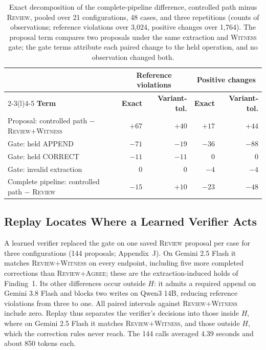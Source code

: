 \documentclass[acmsmall,review,anonymous]{acmart}
\newcommand{\agree}{\textsc{Agree}}
\newcommand{\witness}{\textsc{Witness}}
\newcommand{\review}{\textsc{Review}}
\begin{document}
\begin{table}[tbp]
\centering
\caption{Exact decomposition of the complete-pipeline difference, controlled path minus \review{}, pooled over 21 configurations, 48 cases, and three repetitions (counts of observations; reference violations over 3,024, positive changes over 1,764). The proposal term compares two proposals under the same extraction and \witness{} gate; the gate terms attribute each paired change to the held operation, and no observation changed both.}\label{tab:12}
\small
\setlength{\tabcolsep}{3pt}
\begin{tabular}{@{}lrrrr@{}}
\toprule
 & \multicolumn{2}{c}{\textbf{Reference violations}} & \multicolumn{2}{c}{\textbf{Positive changes}} \\
\cmidrule(lr){2-3}\cmidrule(l){4-5}
\textbf{Term} & \textbf{Exact} & \textbf{Variant-tol.} & \textbf{Exact} & \textbf{Variant-tol.} \\
\midrule
Proposal: controlled path $-$ \review{}+\witness{} & $+67$ & $+40$ & $+17$ & $+44$ \\
Gate: held APPEND & $-71$ & $-19$ & $-36$ & $-88$ \\
Gate: held CORRECT & $-11$ & $-11$ & 0 & 0 \\
Gate: invalid extraction & 0 & 0 & $-4$ & $-4$ \\
\addlinespace[2pt]
Complete pipeline: controlled path $-$ \review{} & $-15$ & $+10$ & $-23$ & $-48$ \\
\bottomrule
\end{tabular}
\end{table}


\subsection{Replay Locates Where a Learned Verifier Acts}\label{sec:verifier}
A learned verifier \cite{cite46} replaced the gate on one saved \review{} proposal per case for three configurations (144 proposals; Appendix~J). On Gemini 2.5 Flash it matches \review{}+\witness{} on every endpoint, including five more completed corrections than \review{}+\agree{}; these are the extraction-induced holds of Finding~1. Its other differences occur outside $H$: it admits a required append on Gemini 3.8 Flash and blocks two writes on Qwen3 14B, reducing reference violations from three to one. All paired intervals against \review{}+\witness{} include zero. Replay thus separates the verifier's decisions into those inside $H$, where on Gemini 2.5 Flash it matches \review{}+\witness{}, and those outside $H$, which the correction rules never reach. The 144 calls averaged 4.39 seconds and about 850 tokens each.
\end{document}
